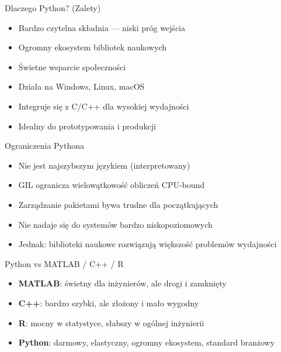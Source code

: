 \documentclass[aspectratio=169]{beamer}
\begin{document}
\begin{frame}{Dlaczego Python? (Zalety)}
  \begin{itemize}
    \item Bardzo czytelna składnia — niski próg wejścia
    \item Ogromny ekosystem bibliotek naukowych
    \item Świetne wsparcie społeczności
    \item Działa na Windows, Linux, macOS
    \item Integruje się z C/C++ dla wysokiej wydajności
    \item Idealny do prototypowania i produkcji
  \end{itemize}
\end{frame}

\begin{frame}{Ograniczenia Pythona}
  \begin{itemize}
    \item Nie jest najszybszym językiem (interpretowany)
    \item GIL ogranicza wielowątkowość obliczeń CPU-bound
    \item Zarządzanie pakietami bywa trudne dla początkujących
    \item Nie nadaje się do systemów bardzo niskopoziomowych
    \item Jednak: biblioteki naukowe rozwiązują większość problemów wydajności
  \end{itemize}
\end{frame}

\begin{frame}{Python vs MATLAB / C++ / R}
  \begin{itemize}
    \item \textbf{MATLAB}: świetny dla inżynierów, ale drogi i zamknięty
    \item \textbf{C++}: bardzo szybki, ale złożony i mało wygodny
    \item \textbf{R}: mocny w statystyce, słabszy w ogólnej inżynierii
    \item \textbf{Python}: darmowy, elastyczny, ogromny ekosystem, standard branżowy
  \end{itemize}
\end{frame}
\end{document}
